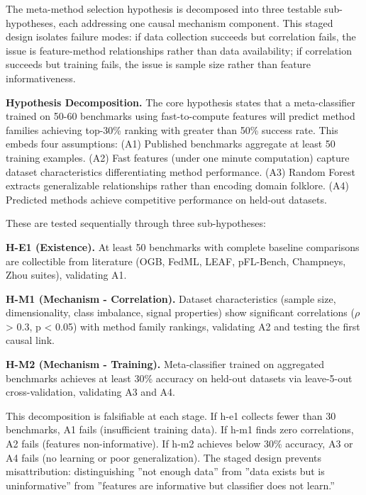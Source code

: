 
The meta-method selection hypothesis is decomposed into three testable sub-hypotheses, each addressing one causal mechanism component. This staged design isolates failure modes: if data collection succeeds but correlation fails, the issue is feature-method relationships rather than data availability; if correlation succeeds but training fails, the issue is sample size rather than feature informativeness.

\textbf{Hypothesis Decomposition.} The core hypothesis states that a meta-classifier trained on 50-60 benchmarks using fast-to-compute features will predict method families achieving top-30\% ranking with greater than 50\% success rate. This embeds four assumptions: (A1) Published benchmarks aggregate at least 50 training examples. (A2) Fast features (under one minute computation) capture dataset characteristics differentiating method performance. (A3) Random Forest extracts generalizable relationships rather than encoding domain folklore. (A4) Predicted methods achieve competitive performance on held-out datasets.

These are tested sequentially through three sub-hypotheses:

\textbf{H-E1 (Existence).} At least 50 benchmarks with complete baseline comparisons are collectible from literature (OGB, FedML, LEAF, pFL-Bench, Champneys, Zhou suites), validating A1.

\textbf{H-M1 (Mechanism - Correlation).} Dataset characteristics (sample size, dimensionality, class imbalance, signal properties) show significant correlations ($\rho$ > 0.3, p < 0.05) with method family rankings, validating A2 and testing the first causal link.

\textbf{H-M2 (Mechanism - Training).} Meta-classifier trained on aggregated benchmarks achieves at least 30\% accuracy on held-out datasets via leave-5-out cross-validation, validating A3 and A4.

This decomposition is falsifiable at each stage. If h-e1 collects fewer than 30 benchmarks, A1 fails (insufficient training data). If h-m1 finds zero correlations, A2 fails (features non-informative). If h-m2 achieves below 30\% accuracy, A3 or A4 fails (no learning or poor generalization). The staged design prevents misattribution: distinguishing ''not enough data'' from ''data exists but is uninformative'' from ''features are informative but classifier does not learn.''

